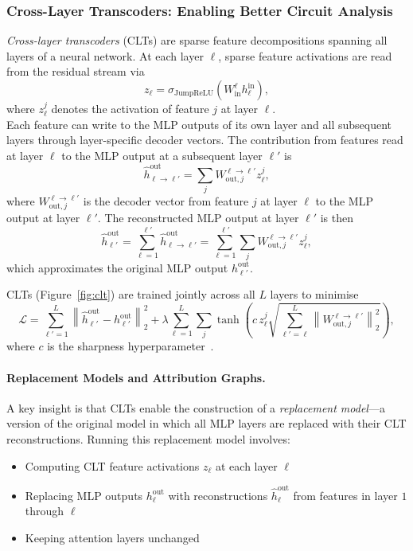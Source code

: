 \subsubsection{Cross-Layer Transcoders: Enabling Better Circuit Analysis}
\label{subsubsec:cross-layer-transcoder}

\begin{definitionbox}
\emph{Cross-layer transcoders} (CLTs) are sparse feature decompositions spanning all layers of a neural network. At each layer $\ell$, sparse feature activations are read from the residual stream via
\[
z_{\ell}
=
\sigma_{\text{JumpReLU}}
\!\left(
W_{\text{in}}^\ell h_{\ell}^{\text{in}}
\right),
\]
where $z_\ell^j$ denotes the activation of feature $j$ at layer $\ell$.\\

Each feature can write to the MLP outputs of its own layer and all subsequent layers through layer-specific decoder vectors. The contribution from features read at layer $\ell$ to the MLP output at a subsequent layer $\ell'$ is
\[
\hat{h}_{\ell \to \ell'}^{\text{out}}
=
\sum_j
W_{\text{out},j}^{\ell \to \ell'} z_{\ell}^{j},
\]
where $W_{\text{out},j}^{\ell \to \ell'}$ is the decoder vector from feature $j$ at layer $\ell$ to the MLP output at layer $\ell'$. The reconstructed MLP output at layer $\ell'$ is then
\[
\hat{h}_{\ell'}^{\text{out}}
=
\sum_{\ell=1}^{\ell'}
\hat{h}_{\ell \to \ell'}^{\text{out}}
=
\sum_{\ell=1}^{\ell'}
\sum_j
W_{\text{out},j}^{\ell \to \ell'} z_{\ell}^{j},
\]
which approximates the original MLP output $h_{\ell'}^{\text{out}}$.
\end{definitionbox}

CLTs (Figure~\ref{fig:clt}) are trained jointly across all $L$ layers to minimise
\[
\mathcal{L}
=
\sum_{\ell'=1}^{L}
\left\|
\hat{h}_{\ell'}^{\text{out}}
-
h_{\ell'}^{\text{out}}
\right\|_2^2
+
\lambda
\sum_{\ell=1}^{L}
\sum_j
\tanh\!\left(
c\,
z_{\ell}^{j}
\sqrt{
\sum_{\ell'=\ell}^{L}
\left\|
W_{\text{out},j}^{\ell \to \ell'}
\right\|_2^2
}
\right),
\]
where $c$ is the sharpness hyperparameter~.

\paragraph{Replacement Models and Attribution Graphs.}
A key insight is that CLTs enable the construction of a \emph{replacement model}---a version of the original model in which all MLP layers are replaced with their CLT reconstructions. Running this replacement model involves:
\begin{itemize}
    \item Computing CLT feature activations $z_{\ell}$ at each layer $\ell$
    \item Replacing MLP outputs $h^{\text{out}}_{\ell}$ with reconstructions $\hat{h}^{\text{out}}_{\ell}$ from features in layer $1$ through $\ell$
    \item Keeping attention layers unchanged
\end{itemize}

